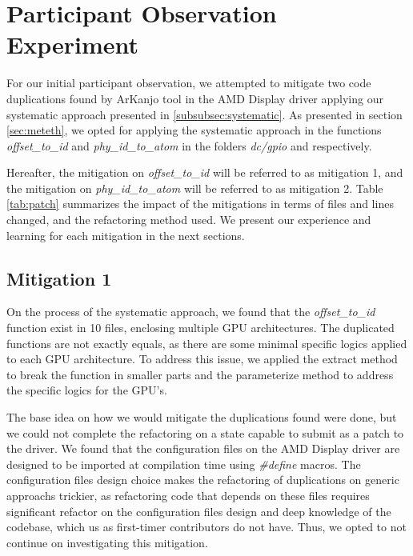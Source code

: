 \en

\section{Participant Observation Experiment}

For our initial participant observation, we attempted to mitigate two code duplications found by ArKanjo tool
in the AMD Display driver applying our systematic approach presented in \ref{subsubsec:systematic}. 
As presented in section \ref{sec:meteth}, we opted for applying the systematic approach in the functions 
\textit{offset\_to\_id} and \textit{phy\_id\_to\_atom} in the folders \textit{dc/gpio} and  respectively.

Hereafter, the mitigation on \textit{offset\_to\_id} will be referred to as mitigation 1, and the mitigation on 
\textit{phy\_id\_to\_atom} will be referred to as mitigation 2. Table \ref{tab:patch} summarizes the impact of the mitigations
in terms of files and lines changed, and the refactoring method used. We present our experience and learning for each mitigation 
in the next sections.



\subsection{Mitigation 1}

On the process of the systematic approach, we found that the \textit{offset\_to\_id} function exist in 10 files, enclosing
multiple GPU architectures. The duplicated functions are not exactly equals, as there are some minimal specific logics applied
to each GPU architecture. To address this issue, we applied the extract method to break the function in smaller parts and the 
parameterize method to address the specific logics for the GPU's.

The base idea on how we would mitigate the duplications found were done, but we could not complete the refactoring on a state 
capable to submit as a patch to the driver. 
We found that the configuration files on the AMD Display driver are designed to be imported at compilation time
using \textit{\#define} macros. The configuration files design choice makes the refactoring of duplications on generic 
approachs trickier, as refactoring code that depends on these files requires significant refactor on the configuration files
design and deep knowledge of the codebase, which us as first-timer contributors do not have. Thus, we opted to not continue 
on investigating this mitigation.

